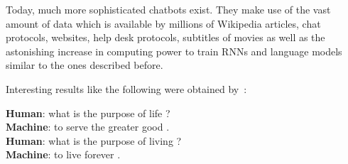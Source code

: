 Today, much more sophisticated chatbots exist. They make use of the vast amount
of data which is available by millions of Wikipedia articles, chat protocols,
websites, help desk protocols, subtitles of movies as well as the astonishing
increase in computing power to train
\glspl{RNN} and language models similar to the ones described before.

Interesting results like the following were obtained
by~\cite{vinyals2015neural}:
\begin{displayquote}
\textbf{Human}: what is the purpose of life ?\\
\textbf{Machine}: to serve the greater good .\\
\textbf{Human}: what is the purpose of living ?\\
\textbf{Machine}: to live forever .
\end{displayquote}
